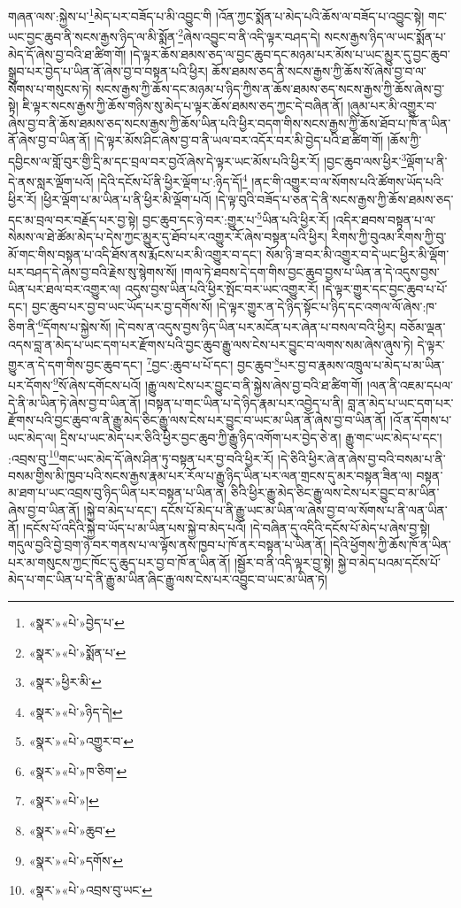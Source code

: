 གཞན་ལས་:སྐྱེས་པ་\footnote{«སྣར་»«པེ་»བྱེད་པ་}མེད་པར་བཟོད་པ་མི་འབྱུང་གི །འོན་ཀྱང་སྨོན་པ་མེད་པའི་ཆོས་ལ་བཟོད་པ་འབྱུང་སྟེ། གང་ཡང་བྱང་ཆུབ་ནི་སངས་རྒྱས་ཉིད་ལ་མི་སྨོན་\footnote{«སྣར་»«པེ་»སྨོན་པ་}ཞེས་འབྱུང་བ་ནི་འདི་ལྟར་བཤད་དེ། སངས་རྒྱས་ཉིད་ལ་ཡང་སྨོན་པ་མེད་དོ་ཞེས་བྱ་བའི་ཐ་ཚིག་གོ། །དེ་ལྟར་ཆོས་ཐམས་ཅད་ལ་བྱང་ཆུབ་དང་མཉམ་པར་མོས་པ་ཡང་མྱུར་དུ་བྱང་ཆུབ་སྒྲུབ་པར་བྱེད་པ་ཡིན་ནོ་ཞེས་བྱ་བ་བསྟན་པའི་ཕྱིར། ཆོས་ཐམས་ཅད་ནི་སངས་རྒྱས་ཀྱི་ཆོས་སོ་ཞེས་བྱ་བ་ལ་སོགས་པ་གསུངས་ཏེ། སངས་རྒྱས་ཀྱི་ཆོས་དང་མཉམ་པ་ཉིད་ཀྱིས་ན་ཆོས་ཐམས་ཅད་སངས་རྒྱས་ཀྱི་ཆོས་ཞེས་བྱ་སྟེ། ཇི་ལྟར་སངས་རྒྱས་ཀྱི་ཆོས་གཉིས་སུ་མེད་པ་ལྟར་ཆོས་ཐམས་ཅད་ཀྱང་དེ་བཞིན་ནོ། །ཞུམ་པར་མི་འགྱུར་བ་ཞེས་བྱ་བ་ནི་ཆོས་ཐམས་ཅད་སངས་རྒྱས་ཀྱི་ཆོས་ཡིན་པའི་ཕྱིར་བདག་གིས་སངས་རྒྱས་ཀྱི་ཆོས་ཐོབ་པ་ཁོ་ན་ཡིན་ནོ་ཞེས་བྱ་བ་ཡིན་ནོ། །དེ་ལྟར་མོས་ཤིང་ཞེས་བྱ་བ་ནི་ཡལ་བར་འདོར་བར་མི་བྱེད་པའི་ཐ་ཚིག་གོ། །ཆོས་ཀྱི་དབྱིངས་ལ་གློ་བུར་གྱི་དྲི་མ་དང་བྲལ་བར་བྱའོ་ཞེས་དེ་ལྟར་ཡང་མོས་པའི་ཕྱིར་རོ། །བྱང་ཆུབ་ལས་ཕྱིར་\footnote{«སྣར་»ཕྱིར་མི་}ལྡོག་པ་ནི་དེ་ནས་སླར་ལྡོག་པའོ། །དེའི་དངོས་པོ་ནི་ཕྱིར་ལྡོག་པ་:ཉིད་དོ།\footnote{«སྣར་»«པེ་»ཉིད་དེ།} །ནང་གི་འགྱུར་བ་ལ་སོགས་པའི་ཚོགས་ཡོད་པའི་ཕྱིར་རོ། །ཕྱིར་ལྡོག་པ་མ་ཡིན་པ་ནི་ཕྱིར་མི་ལྡོག་པའོ། །དེ་ལྟ་བུའི་བཟོད་པ་ཅན་དེ་ནི་སངས་རྒྱས་ཀྱི་ཆོས་ཐམས་ཅད་དང་མ་བྲལ་བར་བརྗོད་པར་བྱ་སྟེ། བྱང་ཆུབ་དང་ཉེ་བར་:གྱུར་པ་\footnote{«སྣར་»«པེ་»འགྱུར་བ་}ཡིན་པའི་ཕྱིར་རོ། །འདིར་ཐབས་བསྟན་པ་ལ་སེམས་ལ་ཐེ་ཚོམ་མེད་པ་དེས་ཀྱང་མྱུར་དུ་ཐོབ་པར་འགྱུར་རོ་ཞེས་བསྟན་པའི་ཕྱིར། རིགས་ཀྱི་བུའམ་རིགས་ཀྱི་བུ་མོ་གང་གིས་བསྟན་པ་འདི་ཐོས་ནས་རྨོངས་པར་མི་འགྱུར་བ་དང་། སོམ་ཉི་ཟ་བར་མི་འགྱུར་བ་དེ་ཡང་ཕྱིར་མི་ལྡོག་པར་བཤད་དེ་ཞེས་བྱ་བའི་རྗེས་སུ་སྙེགས་སོ། །གལ་ཏེ་ཐབས་དེ་དག་གིས་བྱང་ཆུབ་བྱས་པ་ཡིན་ན་དེ་འདུས་བྱས་ཡིན་པར་ཐལ་བར་འགྱུར་ལ། འདུས་བྱས་ཡིན་པའི་ཕྱིར་སྤོང་བར་ཡང་འགྱུར་རོ། །དེ་ལྟར་གྱུར་དང་བྱང་ཆུབ་པ་པོ་དང་། བྱང་ཆུབ་པར་བྱ་བ་ཡང་ཡོད་པར་བྱ་དགོས་སོ། །དེ་ལྟར་གྱུར་ན་དེ་ཉིད་སྟོང་པ་ཉིད་དང་འགལ་ལོ་ཞེས་:ཁ་ཅིག་ནི་\footnote{«སྣར་»«པེ་»ཁ་ཅིག་}དོགས་པ་སྐྱེས་སོ། །དེ་བས་ན་འདུས་བྱས་ཉིད་ཡིན་པར་མངོན་པར་ཞེན་པ་བསལ་བའི་ཕྱིར། བཅོམ་ལྡན་འདས་བླ་ན་མེད་པ་ཡང་དག་པར་རྫོགས་པའི་བྱང་ཆུབ་རྒྱུ་ལས་ངེས་པར་བྱུང་བ་ལགས་སམ་ཞེས་ཞུས་ཏེ། དེ་ལྟར་གྱུར་ན་དེ་དག་གིས་བྱང་ཆུབ་དང་། \footnote{«སྣར་»«པེ་»།  }བྱང་:ཆུབ་པ་པོ་དང་། བྱང་ཆུབ་\footnote{«སྣར་»«པེ་»ཆུབ་}པར་བྱ་བ་རྣམས་འཁྲུལ་པ་མེད་པ་མ་ཡིན་པར་དོགས་\footnote{«སྣར་»«པེ་»དགོས་}སོ་ཞེས་དགོངས་པའོ། །རྒྱུ་ལས་ངེས་པར་བྱུང་བ་ནི་སྐྱེས་ཞེས་བྱ་བའི་ཐ་ཚིག་གོ། །ལན་ནི་འཇམ་དཔལ་དེ་ནི་མ་ཡིན་ཏེ་ཞེས་བྱ་བ་ཡིན་ནོ། །བསྟན་པ་གང་ཡིན་པ་དེ་ཉིད་རྣམ་པར་འབྱེད་པ་ནི། བླ་ན་མེད་པ་ཡང་དག་པར་རྫོགས་པའི་བྱང་ཆུབ་ལ་ནི་རྒྱུ་མེད་ཅིང་རྒྱུ་ལས་ངེས་པར་བྱུང་བ་ཡང་མ་ཡིན་ནོ་ཞེས་བྱ་བ་ཡིན་ནོ། །འོ་ན་དོགས་པ་ཡང་མེད་ལ། དྲིས་པ་ཡང་མེད་པར་ཅིའི་ཕྱིར་བྱང་ཆུབ་ཀྱི་རྒྱུ་ཉིད་འགོག་པར་བྱེད་ཅེ་ན། རྒྱུ་གང་ཡང་མེད་པ་དང་། :འབྲས་བུ་\footnote{«སྣར་»«པེ་»འབྲས་བུ་ཡང་}གང་ཡང་མེད་དོ་ཞེས་ཤིན་ཏུ་བསྟན་པར་བྱ་བའི་ཕྱིར་རོ། །དེ་ཅིའི་ཕྱིར་ཞེ་ན་ཞེས་བྱ་བའི་བསམ་པ་ནི་བསམ་གྱིས་མི་ཁྱབ་པའི་སངས་རྒྱས་རྣམ་པར་རོལ་པ་རྒྱུ་ཉིད་ཡིན་པར་ལན་གྲངས་དུ་མར་བསྟན་ཟིན་ལ། བསྟན་མ་ཐག་པ་ཡང་འབྲས་བུ་ཉིད་ཡིན་པར་བསྟན་པ་ཡིན་ན། ཅིའི་ཕྱིར་རྒྱུ་མེད་ཅིང་རྒྱུ་ལས་ངེས་པར་བྱུང་བ་མ་ཡིན་ཞེས་བྱ་བ་ཡིན་ནོ། །སྐྱེ་བ་མེད་པ་དང་། དངོས་པོ་མེད་པ་ནི་རྒྱུ་ཡང་མ་ཡིན་ལ་ཞེས་བྱ་བ་ལ་སོགས་པ་ནི་ལན་ཡིན་ནོ། །དངོས་པོ་འདིའི་སྐྱེ་བ་ཡོད་པ་མ་ཡིན་པས་སྐྱེ་བ་མེད་པའོ། །དེ་བཞིན་དུ་འདིའི་དངོས་པོ་མེད་པ་ཞེས་བྱ་སྟེ། གདུལ་བྱའི་བྱེ་བྲག་ཉེ་བར་གནས་པ་ལ་ལྟོས་ནས་ཁྱབ་པ་ཁོ་ནར་བསྟན་པ་ཡིན་ནོ། །དེའི་ཕྱོགས་ཀྱི་ཆོས་ཁོ་ན་ཡིན་པར་མ་གསུངས་ཀྱང་ཁོང་དུ་ཆུད་པར་བྱ་བ་ཁོ་ན་ཡིན་ནོ། །སྦྱོར་བ་ནི་འདི་ལྟར་བྱ་སྟེ། སྐྱེ་བ་མེད་པའམ་དངོས་པོ་མེད་པ་གང་ཡིན་པ་དེ་ནི་རྒྱུ་མ་ཡིན་ཞིང་རྒྱུ་ལས་ངེས་པར་འབྱུང་བ་ཡང་མ་ཡིན་ཏེ། 